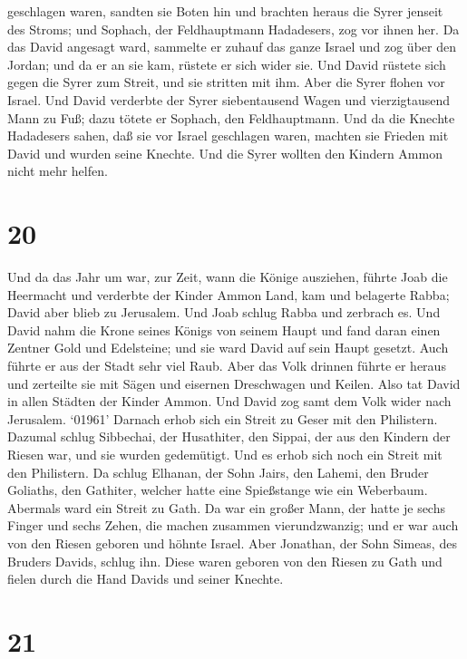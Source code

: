 geschlagen waren, sandten sie Boten hin und brachten heraus die Syrer
jenseit des Stroms; und Sophach, der Feldhauptmann Hadadesers, zog vor
ihnen her.  Da das David angesagt ward, sammelte er zuhauf
das ganze Israel und zog über den Jordan; und da er an sie kam, rüstete
er sich wider sie. Und David rüstete sich gegen die Syrer zum Streit,
und sie stritten mit ihm.  Aber die Syrer flohen vor
Israel. Und David verderbte der Syrer siebentausend Wagen und
vierzigtausend Mann zu Fuß; dazu tötete er Sophach, den Feldhauptmann.
 Und da die Knechte Hadadesers sahen, daß sie vor Israel
geschlagen waren, machten sie Frieden mit David und wurden seine
Knechte. Und die Syrer wollten den Kindern Ammon nicht mehr helfen.

\hypertarget{section-19}{%
\section{20}\label{section-19}}

 Und da das Jahr um war, zur Zeit, wann die Könige
ausziehen, führte Joab die Heermacht und verderbte der Kinder Ammon
Land, kam und belagerte Rabba; David aber blieb zu Jerusalem. Und Joab
schlug Rabba und zerbrach es.  Und David nahm die Krone
seines Königs von seinem Haupt und fand daran einen Zentner Gold und
Edelsteine; und sie ward David auf sein Haupt gesetzt. Auch führte er
aus der Stadt sehr viel Raub.  Aber das Volk drinnen führte
er heraus und zerteilte sie mit Sägen und eisernen Dreschwagen und
Keilen. Also tat David in allen Städten der Kinder Ammon. Und David zog
samt dem Volk wider nach Jerusalem.  `01961' Darnach erhob
sich ein Streit zu Geser mit den Philistern. Dazumal schlug Sibbechai,
der Husathiter, den Sippai, der aus den Kindern der Riesen war, und sie
wurden gedemütigt.  Und es erhob sich noch ein Streit mit
den Philistern. Da schlug Elhanan, der Sohn Jairs, den Lahemi, den
Bruder Goliaths, den Gathiter, welcher hatte eine Spießstange wie ein
Weberbaum.  Abermals ward ein Streit zu Gath. Da war ein
großer Mann, der hatte je sechs Finger und sechs Zehen, die machen
zusammen vierundzwanzig; und er war auch von den Riesen geboren
 und höhnte Israel. Aber Jonathan, der Sohn Simeas, des
Bruders Davids, schlug ihn.  Diese waren geboren von den
Riesen zu Gath und fielen durch die Hand Davids und seiner Knechte.

\hypertarget{section-20}{%
\section{21}\label{section-20}}

